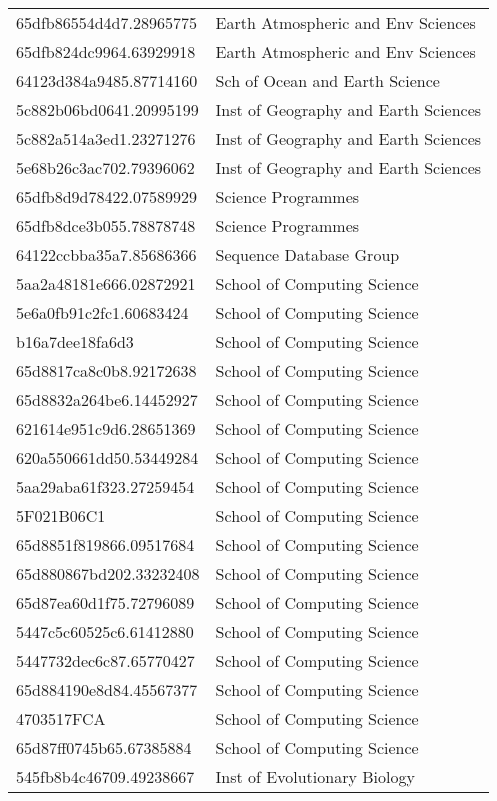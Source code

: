 \begin{tabular}{ll}
65dfb86554d4d7.28965775 & Earth Atmospheric and Env Sciences \\
65dfb824dc9964.63929918 & Earth Atmospheric and Env Sciences \\
64123d384a9485.87714160 & Sch of Ocean and Earth Science \\
5c882b06bd0641.20995199 & Inst of Geography and Earth Sciences \\
5c882a514a3ed1.23271276 & Inst of Geography and Earth Sciences \\
5e68b26c3ac702.79396062 & Inst of Geography and Earth Sciences \\
65dfb8d9d78422.07589929 & Science Programmes \\
65dfb8dce3b055.78878748 & Science Programmes \\
64122ccbba35a7.85686366 & Sequence Database Group \\
5aa2a48181e666.02872921 & School of Computing Science \\
5e6a0fb91c2fc1.60683424 & School of Computing Science \\
b16a7dee18fa6d3 & School of Computing Science \\
65d8817ca8c0b8.92172638 & School of Computing Science \\
65d8832a264be6.14452927 & School of Computing Science \\
621614e951c9d6.28651369 & School of Computing Science \\
620a550661dd50.53449284 & School of Computing Science \\
5aa29aba61f323.27259454 & School of Computing Science \\
5F021B06C1 & School of Computing Science \\
65d8851f819866.09517684 & School of Computing Science \\
65d880867bd202.33232408 & School of Computing Science \\
65d87ea60d1f75.72796089 & School of Computing Science \\
5447c5c60525c6.61412880 & School of Computing Science \\
5447732dec6c87.65770427 & School of Computing Science \\
65d884190e8d84.45567377 & School of Computing Science \\
4703517FCA & School of Computing Science \\
65d87ff0745b65.67385884 & School of Computing Science \\
545fb8b4c46709.49238667 & Inst of Evolutionary Biology \\

\end{tabular}
